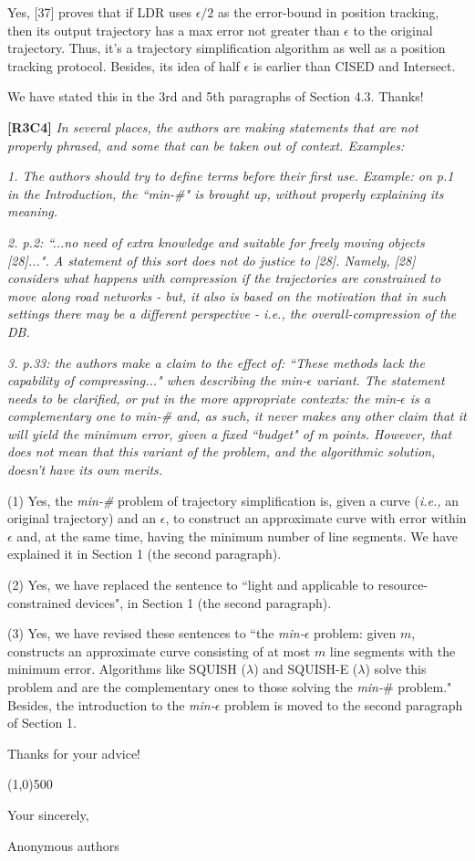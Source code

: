 \documentclass{letter}
\newcommand{\ie}{\emph{i.e.,}\xspace}
\begin{document}
{Yes, [37] proves that if LDR uses $\epsilon/2$ as the error-bound in position tracking, then its output trajectory has a max error not greater than $\epsilon$ to the original trajectory. Thus, it's a trajectory simplification algorithm as well as a position tracking protocol.} Besides, its idea of half $\epsilon$ is earlier than CISED and Intersect.

We have stated this in the 3rd and 5th paragraphs of Section 4.3. Thanks!

\textbf{[R3C4]} \emph{
In several places, the authors are making statements that are not properly phrased, and some that can be taken out of context. Examples:}

\emph{1. The authors should try to define terms before their first use. Example: on p.1 in the Introduction, the ``min-\#" is brought up, without properly explaining its meaning.}


\emph{2. p.2: ``...no need of extra knowledge and suitable for freely moving objects [28]...". A statement of this sort does not do justice to [28].
Namely, [28] considers what happens with compression if the trajectories are constrained to move along road networks - but, it also is based on the motivation that in such settings there may be a different perspective - i.e., the overall-compression of the DB.}


\emph{3. p.33: the authors make a claim to the effect of: ``These methods lack the capability of compressing..." when describing the min-$\epsilon$ variant. The statement needs to be clarified, or put in the more appropriate contexts: the min-$\epsilon$  is a complementary one to min-\# and, as such, it never makes any other claim that it will yield the minimum error, given a fixed ``budget" of m points. However, that does not mean that this variant of the problem, and the algorithmic solution, doesn't have its own merits.}



(1) Yes, the \emph{min-\#} problem of trajectory simplification is, given a curve (\ie an original trajectory) and an $\epsilon$, to construct an approximate curve with error within $\epsilon$ and, at the same time, having the minimum number of line segments. We have explained it in Section 1 (the second paragraph). 

(2) Yes, we have replaced the sentence to ``light and applicable to resource-constrained devices", in Section 1 (the second paragraph). 

(3) Yes, we have revised these sentences to ``the \emph{min-$\epsilon$} problem: given $m$, constructs an approximate curve consisting of at most $m$ line segments with the minimum error. Algorithms like SQUISH ($\lambda$) and SQUISH-E ($\lambda$) solve this problem and are the complementary ones to those solving the \emph{min-$\#$} problem." Besides, the introduction to the \emph{min-$\epsilon$} problem is moved to the second paragraph of Section 1.

Thanks for your advice!

\line(1,0){500}



Your sincerely,

Anonymous authors

%
%
\end{document}
